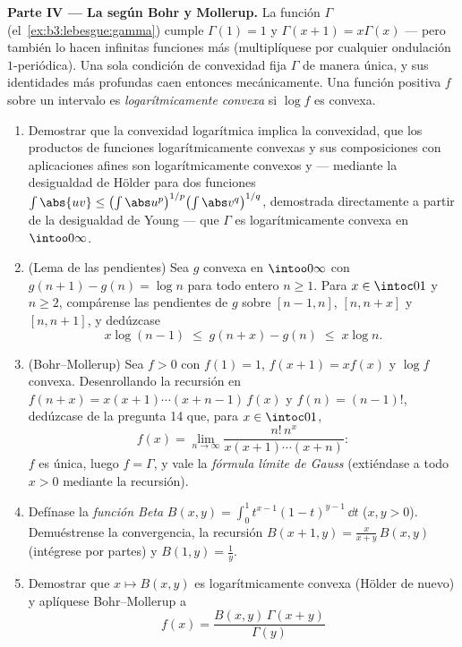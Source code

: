 \begin{problem}
\medskip
\noindent\textbf{Parte IV --- La  según Bohr y Mollerup.} La función $\Gamma$
(el~\cref{ex:b3:lebesgue:gamma}) cumple $\Gamma(1) = 1$ y
$\Gamma(x+1) = x\Gamma(x)$ --- pero también lo hacen infinitas funciones
más (multiplíquese por cualquier ondulación $1$-periódica). Una sola
condición de convexidad fija $\Gamma$ de manera única, y sus identidades
más profundas caen entonces mecánicamente. Una función positiva $f$
sobre un intervalo es \emph{logarítmicamente convexa} si $\log f$ es
convexa.
\begin{enumerate}[resume]
  \item Demostrar que la convexidad logarítmica implica la convexidad,
  que los productos de funciones logarítmicamente convexas y sus
  composiciones con aplicaciones afines son logarítmicamente convexos y
  --- mediante la desigualdad de Hölder para dos funciones
  $\int\abs{uv} \leq
        \bigl(\int\abs u^p\bigr)^{1/p}\bigl(\int\abs
        v^q\bigr)^{1/q}$, demostrada directamente a partir de la
  desigualdad de Young --- que $\Gamma$ es logarítmicamente convexa en
        $\intoo0\infty$.
  \item (Lema de las pendientes) Sea $g$ convexa en $\intoo0\infty$ con
  $g(n+1) - g(n) = \log n$ para todo entero $n
        \geq 1$. Para $x \in \intoc01$ y $n \geq 2$, compárense las
  pendientes de $g$ sobre $[n-1, n]$, $[n, n+x]$ y $[n, n+1]$, y
  dedúzcase
        \[
        x\log(n-1) \;\leq\; g(n + x) - g(n) \;\leq\; x\log n .
        \]
  \item (Bohr--Mollerup) Sea $f > 0$ con $f(1) = 1$, $f(x+1) = xf(x)$ y
  $\log f$ convexa. Desenrollando la recursión en
  $f(n + x) = x(x+1)\cdots(x + n -
        1)\,f(x)$ y $f(n) = (n-1)!$, dedúzcase de la pregunta 14 que,
  para $x \in \intoc01$,
        \[
        f(x) = \lim_{n\to\infty}
        \frac{n!\,n^x}{x(x+1)\cdots(x+n)} :
        \]
        $f$ es única, luego $f = \Gamma$, y vale la \emph{fórmula límite
        de Gauss} (extiéndase a todo $x > 0$ mediante la recursión).
        \item Defínase la \emph{función Beta} $B(x, y) =
        \int_0^1t^{x-1}(1-t)^{y-1}\,\dd t$ ($x, y > 0$). Demuéstrense la
        convergencia, la recursión $B(x+1, y) =
        \frac{x}{x+y}\,B(x, y)$ (intégrese por partes) y
        $B(1, y) = \frac1y$.
  \item Demostrar que $x \mapsto B(x, y)$ es logarítmicamente convexa
  (Hölder de nuevo) y aplíquese Bohr--Mollerup a
        \[
        f(x) = \frac{B(x, y)\,\Gamma(x + y)}{\Gamma(y)}
\]
\end{enumerate}
\end{problem}
